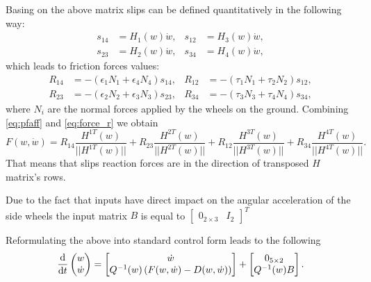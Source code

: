 Basing on the above matrix slips can be defined quantitatively in the following way: 
\begin{equation}
\begin{aligned}
s_{14} &= H_1(w)\dot w, & s_{12} &= H_3(w)\dot w,\\
s_{23} &= H_2(w)\dot w, & s_{34} &= H_4(w)\dot w,
\end{aligned}
\end{equation}
which leads to friction forces values:
\begin{equation}
\begin{aligned}
\label{eq:force_r}
R_{14}&=-(\epsilon_1 N_1 + \epsilon_4 N_4)s_{14}, & R_{12}&=-(\tau_1 N_1 + \tau_2 N_2)s_{12},\\
R_{23}&=-(\epsilon_2 N_2 + \epsilon_3 N_3)s_{23}, & R_{34}&=-(\tau_3 N_3 + \tau_4 N_4)s_{34},
\end{aligned}
\end{equation}
where $N_i$ are the normal forces applied by the wheels on the ground.
Combining \eqref{eq:pfaff} and \eqref{eq:force_r} we obtain
\begin{equation}
F(w, \dot{w}) = R_{14}\frac{H^{1T}(w)}{||H^{1T}(w)||} + R_{23}\frac{H^{2T}(w)}{||H^{2T}(w)||} + R_{12}\frac{H^{3T}(w)}{||H^{3T}(w)||} + R_{34}\frac{H^{4T}(w)}{||H^{4T}(w)||}.
\end{equation}
That means that slips reaction forces are in the direction of transposed $H$ matrix's rows.

Due to the fact that inputs have direct impact on the angular acceleration of the side wheels the input matrix $B$ is equal to $\begin{bmatrix}
0_{2 \times 3} & I_2
\end{bmatrix}^T$ 

Reformulating the above into standard control form leads to the following
\begin{equation}
\frac{\mathrm{d}}{\mathrm{d} t}\begin{pmatrix}
w \\ \dot w
\end{pmatrix}
 = 
 \begin{bmatrix}
 \dot w \\ Q^{-1}(w)\left( F(w, \dot w) - D(w, \dot w) \right)
 \end{bmatrix}+\begin{bmatrix}
 0_{5\times 2} \\ Q^{-1}(w)B
 \end{bmatrix}.
\end{equation}

